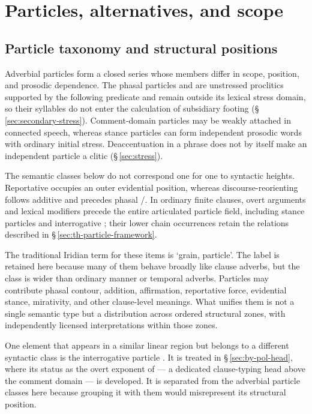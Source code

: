 \chapter{Particles, alternatives, and scope}\label{ch:particles}\label{ch:function-words}

\section{Particle taxonomy and structural positions}\label{sec:adv-particles}

\label{sec:adv-particles-general}

Adverbial particles form a closed series whose members differ in scope,
position, and prosodic dependence. The phasal particles  and 
are unstressed proclitics supported by the following predicate and remain
outside its lexical stress domain, so their syllables do not enter the
calculation of subsidiary footing (§\,\ref{sec:secondary-stress}).
Comment-domain particles may be weakly attached in connected speech, whereas
stance particles can form independent prosodic words with ordinary initial
stress. Deaccentuation in a phrase does not by itself make an independent
particle a clitic (§\,\ref{sec:stress}).

The semantic classes below do not correspond one for one to syntactic heights.
Reportative  occupies an outer evidential position, whereas
discourse-reorienting  follows additive  and precedes
phasal /. In ordinary finite clauses, overt arguments
and lexical modifiers precede the entire articulated particle field, including
stance particles and interrogative ; their lower chain occurrences
retain the relations described in §\,\ref{sec:th-particle-framework}.

The traditional Iridian term for these items is  `grain, particle'.
The label  is retained here because many of them behave
broadly like clause adverbs, but the class is wider than ordinary manner or
temporal adverbs. Particles may contribute phasal contour, addition,
affirmation, reportative force, evidential stance, mirativity, and other
clause-level meanings. What unifies them is not a single semantic type but a
distribution across ordered structural zones, with independently licensed
interpretations within those zones.

One element that appears in a similar linear region but belongs to a different
syntactic class is the interrogative particle . It is treated in
§\,\ref{sec:by-pol-head}, where its status as the overt exponent of  —
a dedicated clause-typing head above the comment domain — is developed. It
is separated from the adverbial particle classes here because grouping it with
them would misrepresent its structural position.

